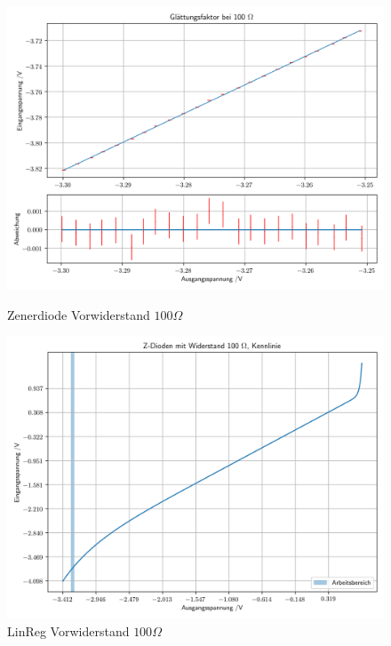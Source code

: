 \documentclass[12pt,twoside,a4paper]{scrartcl}
\begin{document}
		\begin{figure}[H]
			\centering
			\begin{minipage}{0.49 \textwidth}
					\includegraphics[width = \textwidth]{Plots/zener/diff_res_100}
			\caption{Zenerdiode Vorwiderstand $100 \Omega$}
			\end{minipage}
			\begin{minipage}{0.49 \textwidth}
					\includegraphics[width = \textwidth]{Plots/zener/spannungenZener_100}
			\caption{LinReg Vorwiderstand $100 \Omega$}
			\end{minipage}
		\end{figure}
\end{document}
